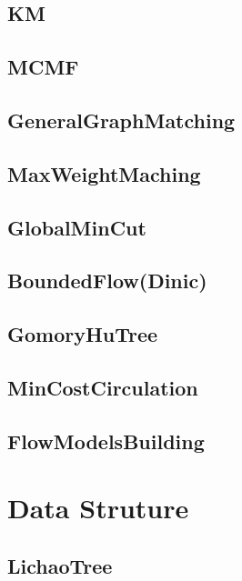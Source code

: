 \subsection{KM}

\subsection{MCMF}

\subsection{GeneralGraphMatching}

\subsection{MaxWeightMaching}

\subsection{GlobalMinCut}

\subsection{BoundedFlow(Dinic)}

\subsection{GomoryHuTree}

\subsection{MinCostCirculation}

\subsection{FlowModelsBuilding}

\section{Data Struture}
\subsection{LichaoTree}

